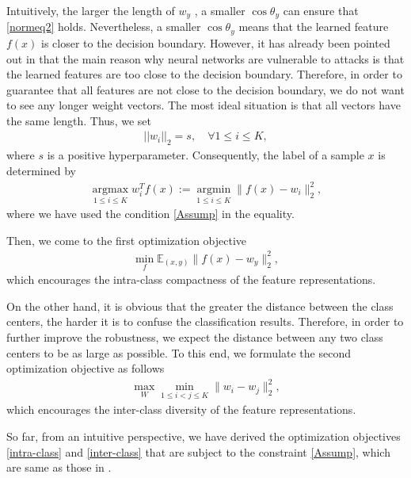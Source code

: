 \documentclass[preprint,review,12pt]{elsarticle}
\numberwithin{equation}{section}
\begin{document}
	Intuitively,
    the larger the length of $ w_y $  ,
    a smaller $ \cos \theta_y $  can ensure that \eqref{normeq2} holds.
	Nevertheless, a smaller $ \cos \theta_y $  means that the learned feature  $ f(x) $  is closer to the decision boundary.
	However,  it has already been pointed out  in \cite{moosavi2016} that the main reason why neural networks are vulnerable to attacks
    is that the learned features are too close to the decision boundary.
    Therefore,  in order to guarantee that all features are not close to the decision boundary,
    we do not want to see any longer weight vectors.
    The most ideal situation is that all vectors have the same length.
    Thus, we set
     \begin{align}
     \label{Assump}
              ||w_i||_2 = s , \quad \forall 1 \leq i \leq K,
     \end{align}
     where $ s $ is a positive hyperparameter.
     Consequently, the label of a sample $ x $  is determined by
	\begin{align*}
		\mathop{\arg \max} \limits_{1\leq i \leq K} w_i^T f(x) := \mathop{\arg \min} \limits_{1\leq i \leq K}\|f(x) - w_i\|_2^2,
	\end{align*}
	where we have used the condition \eqref{Assump} in the equality.


	Then, we come to  the first optimization objective
	\begin{align}
		\label{intra-class}
		\min_{ f} \mathbb{E}_{(x, y)} \|f(x) - w_y\|_2^2,
	\end{align}
    which encourages the intra-class compactness of the  feature representations.

   On the other hand,
   it is obvious that the greater the distance between the class centers,  the harder it  is to confuse the classification results.
   Therefore, in order to further improve the robustness,
   we expect the distance between any two class centers to be as large as possible.
   To this end, we formulate the second optimization objective as follows
   	\begin{align}
		\label{inter-class}
		\max_W \min_{1\leq i<j \leq K} \|w_i - w_j\|_2^2,
	\end{align}
   which encourages the inter-class diversity of the feature representations.


   So far,  from an intuitive perspective,
   we have derived the optimization objectives \eqref{intra-class} and \eqref{inter-class} that are subject to the constraint \eqref{Assump},
   which  are same as those in \cite{pang2018,pang2020}.
	
\end{document}
